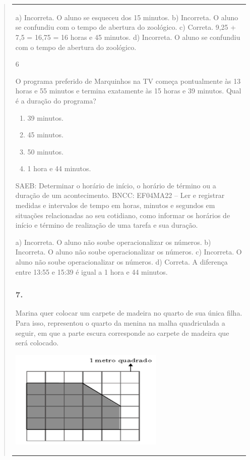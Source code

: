 \begin{mdframed}[linewidth=2pt,linecolor=salmao,roundcorner=2pt]
\begin{itemize}
{\begin{itemize}
\begin{escolha}
{\begin{quote}
{\begin{escolha}
{{{{{\begin{longtable}[]{@{}l@{}}
\begin{itemize}
{a) Incorreta. O aluno se esqueceu dos 15 minutos.
b) Incorreta. O aluno se confundiu com o tempo de abertura do zoológico.
c) Correta. 9,25 + 7,5 = 16,75 = 16 horas e 45 minutos.
d) Incorreta. O aluno se confundiu com o tempo de abertura do zoológico.

\num{6}

O programa preferido de Marquinhos na TV começa pontualmente às 13
horas e 55 minutos e termina exatamente às 15 horas e 39 minutos. Qual é a
duração do programa?

\begin{enumerate}
\item
  39 minutos.
\item
  45 minutos.
\item
  50 minutos.
\item
  1 hora e 44 minutos.
\end{enumerate}

SAEB: Determinar o horário de início, o horário de término ou
a duração de um acontecimento.
BNCC: EF04MA22 -- Ler e registrar medidas e intervalos de tempo em horas, minutos e segundos em
situações relacionadas ao seu cotidiano, como informar os horários de início e término de realização
de uma tarefa e sua duração.

a) Incorreta. O aluno não soube operacionalizar os números.
b) Incorreta. O aluno não soube operacionalizar os números.
c) Incorreta. O aluno não soube operacionalizar os números.
d) Correta. A diferença entre 13:55 e 15:39 é igual a 1 hora e 44 minutos.

\subsubsection{7. }

Marina quer colocar um carpete de madeira no quarto de sua única filha.
Para isso, representou o quarto da menina na malha quadriculada a seguir, em que a parte escura corresponde ao carpete de madeira que será
colocado.

\includegraphics[width=2.90385in,height=1.84662in]{media/image160.png}

}
\end{itemize}
\end{longtable}}}}}}
\end{escolha}}
\end{quote}}
\end{escolha}
\end{itemize}}
\end{itemize}
\end{mdframed}
